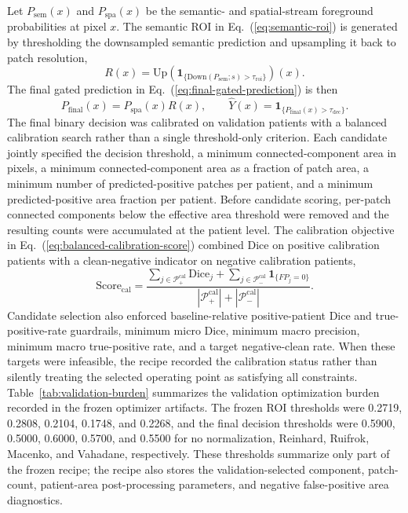 \documentclass[a4paper,fleqn]{cas-dc}
\newcommand{\indicator}[1]{\mathbf{1}_{\{#1\}}}
\begin{document}
Let $P_{\mathrm{sem}}(x)$ and $P_{\mathrm{spa}}(x)$ be the semantic- and spatial-stream foreground probabilities at pixel $x$. The semantic ROI in Eq.~(\ref{eq:semantic-roi}) is generated by thresholding the downsampled semantic prediction and upsampling it back to patch resolution,
\begin{equation}
R(x)=\mathrm{Up}\!\left(\indicator{\mathrm{Down}(P_{\mathrm{sem}};s)>\tau_{\mathrm{roi}}}\right)(x).
\label{eq:semantic-roi}
\end{equation}
The final gated prediction in Eq.~(\ref{eq:final-gated-prediction}) is then
\begin{equation}
P_{\mathrm{final}}(x)=P_{\mathrm{spa}}(x)R(x),\qquad
\hat{Y}(x)=\indicator{P_{\mathrm{final}}(x)>\tau_{\mathrm{dec}}}.
\label{eq:final-gated-prediction}
\end{equation}
The final binary decision was calibrated on validation patients with a balanced calibration search rather than a single threshold-only criterion. Each candidate jointly specified the decision threshold, a minimum connected-component area in pixels, a minimum connected-component area as a fraction of patch area, a minimum number of predicted-positive patches per patient, and a minimum predicted-positive area fraction per patient. Before candidate scoring, per-patch connected components below the effective area threshold were removed and the resulting counts were accumulated at the patient level. The calibration objective in Eq.~(\ref{eq:balanced-calibration-score}) combined Dice on positive calibration patients with a clean-negative indicator on negative calibration patients,
\begin{equation}
\mathrm{Score}_{\mathrm{cal}} =
\frac{
\sum_{j\in\mathcal{P}_+^{\mathrm{cal}}}\mathrm{Dice}_j
+
\sum_{j\in\mathcal{P}_-^{\mathrm{cal}}}\indicator{FP_j=0}
}{
|\mathcal{P}_+^{\mathrm{cal}}|+|\mathcal{P}_-^{\mathrm{cal}}|}.
\label{eq:balanced-calibration-score}
\end{equation}
Candidate selection also enforced baseline-relative positive-patient Dice and true-positive-rate guardrails, minimum micro Dice, minimum macro precision, minimum macro true-positive rate, and a target negative-clean rate. When these targets were infeasible, the recipe recorded the calibration status rather than silently treating the selected operating point as satisfying all constraints. Table~\ref{tab:validation-burden} summarizes the validation optimization burden recorded in the frozen optimizer artifacts. The frozen ROI thresholds were 0.2719, 0.2808, 0.2104, 0.1748, and 0.2268, and the final decision thresholds were 0.5900, 0.5000, 0.6000, 0.5700, and 0.5500 for no normalization, Reinhard, Ruifrok, Macenko, and Vahadane, respectively. These thresholds summarize only part of the frozen recipe; the recipe also stores the validation-selected component, patch-count, patient-area post-processing parameters, and negative false-positive area diagnostics.
\end{document}
